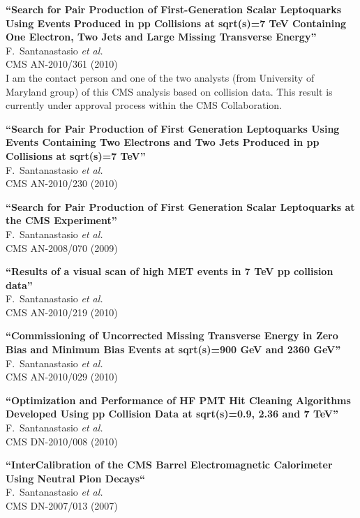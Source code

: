 \documentclass[10pt, a4paper]{article}
\begin{document}
\begin{thebibliography}{599}
{\bf ``Search for Pair Production of First-Generation Scalar Leptoquarks Using Events Produced in pp Collisions at sqrt(s)=7 TeV Containing One Electron, Two Jets and Large Missing Transverse Energy''}
  \\{}F.~Santanastasio {\it et al.}
  \\{}CMS AN-2010/361 (2010)
  \\I am the contact person and one of the two analysts (from University of Maryland group) of this CMS analysis based on collision data. This result is currently under approval process within the CMS Collaboration.

{\bf ``Search for Pair Production of First Generation Leptoquarks Using Events Containing Two Electrons and Two Jets Produced in pp Collisions at sqrt(s)=7 TeV''}
  \\{}F.~Santanastasio {\it et al.}
  \\{}CMS AN-2010/230 (2010)

{\bf ``Search for Pair Production of First Generation Scalar Leptoquarks at the CMS Experiment''}
  \\{}F.~Santanastasio {\it et al.}
  \\{}CMS AN-2008/070 (2009)

{\bf ``Results of a visual scan of high MET events in 7 TeV pp collision data''}
  \\{}F.~Santanastasio {\it et al.}
  \\{}CMS AN-2010/219 (2010)
  
{\bf ``Commissioning of Uncorrected Missing Transverse Energy in Zero Bias and Minimum Bias Events at  sqrt(s)=900 GeV and  2360 GeV''}
  \\{}F.~Santanastasio {\it et al.}
  \\{}CMS AN-2010/029 (2010)

{\bf ``Optimization and Performance of HF PMT Hit Cleaning Algorithms Developed Using pp Collision Data at sqrt(s)=0.9, 2.36 and 7 TeV''}
  \\{}F.~Santanastasio {\it et al.}
  \\{}CMS DN-2010/008 (2010)

{\bf ``InterCalibration of the CMS Barrel Electromagnetic Calorimeter Using Neutral Pion Decays``}
   \\{}F.~Santanastasio {\it et al.}
  \\{}CMS DN-2007/013 (2007)


\end{thebibliography}
\end{document}
